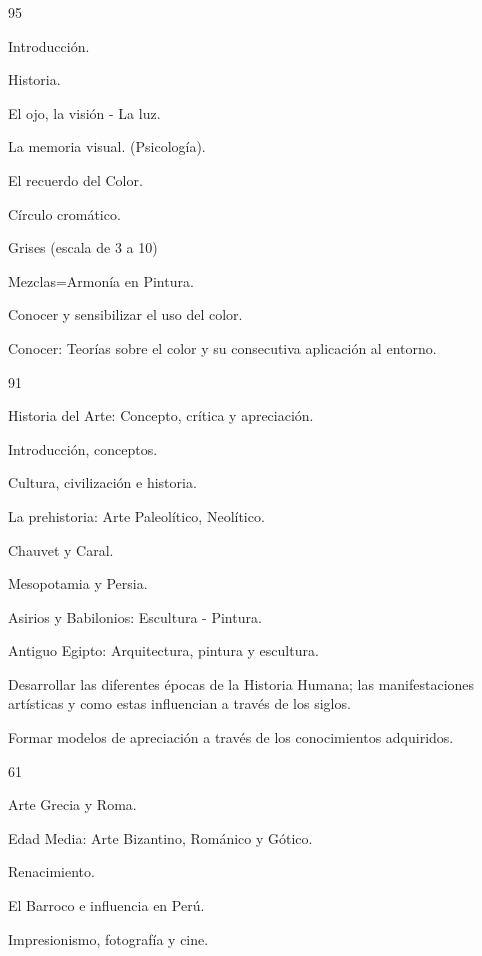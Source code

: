 \begin{syllabus}
\begin{unit}{}{}{9}{5}
\begin{topics}
	\item Introducción.
	\item Historia.
	\item El ojo, la visión - La luz.
	\item La memoria visual. (Psicología).
	\item El recuerdo del Color.
	\item Círculo cromático.
	\item Grises (escala de 3 a 10)
	\item Mezclas=Armonía en Pintura.
\end{topics}
\begin{learningoutcomes}
	\item Conocer y sensibilizar el uso del color.
	\item Conocer: Teorías sobre el color y su consecutiva aplicación al entorno.
\end{learningoutcomes}
\end{unit}

\begin{unit}{}{}{9}{1}
\begin{topics}
	\item Historia del Arte: Concepto, crítica y apreciación.
	\item Introducción, conceptos.
	\item Cultura, civilización e historia.
	\item La prehistoria: Arte Paleolítico, Neolítico.
	\item Chauvet y Caral.
	\item Mesopotamia y Persia.
	\item Asirios y Babilonios: Escultura - Pintura.
	\item Antiguo Egipto: Arquitectura, pintura y escultura.
\end{topics}
\begin{learningoutcomes}
	\item Desarrollar las diferentes épocas de la Historia Humana; las manifestaciones artísticas y como estas influencian a través de los siglos.
	\item Formar modelos de apreciación a través de los conocimientos adquiridos.
\end{learningoutcomes}
\end{unit}

\begin{unit}{}{}{6}{1}
\begin{topics}
	\item Arte Grecia y Roma.
	\item Edad Media: Arte Bizantino, Románico y Gótico.
	\item Renacimiento.
	\item El Barroco e influencia en Perú.
	\item Impresionismo, fotografía y cine.
\end{topics}


\end{unit}
\end{syllabus}
